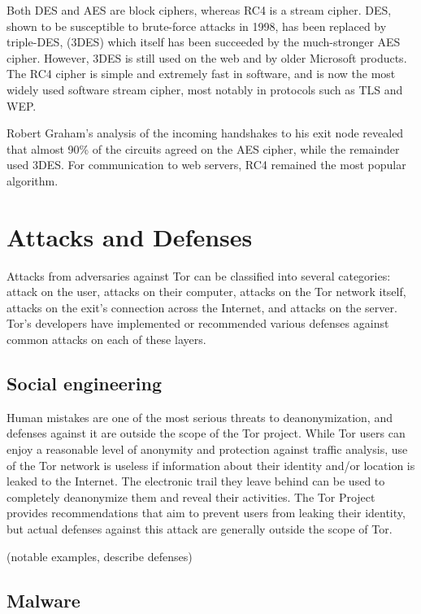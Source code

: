 \documentclass[journal]{IEEEtran}
\begin{document}
Both DES and AES are block ciphers, whereas RC4 is a stream cipher. DES, shown to be susceptible to brute-force attacks in 1998, has been replaced by triple-DES, (3DES) which itself has been succeeded by the much-stronger AES cipher. However, 3DES is still used on the web and by older Microsoft products.\cite{NIST2007}\cite{Bogdanov2011}\cite{Nikolic2009} The RC4 cipher is simple and extremely fast in software, and is now the most widely used software stream cipher, most notably in protocols such as TLS and WEP.

Robert Graham's analysis of the incoming handshakes to his exit node revealed that almost 90\% of the circuits agreed on the AES cipher, while the remainder used 3DES. For communication to web servers, RC4 remained the most popular algorithm.\cite{Graham2013}

\section{Attacks and Defenses}

Attacks from adversaries against Tor can be classified into several categories: attack on the user, attacks on their computer, attacks on the Tor network itself, attacks on the exit's connection across the Internet, and attacks on the server. Tor's developers have implemented or recommended various defenses against common attacks on each of these layers.

\subsection{Social engineering}

Human mistakes are one of the most serious threats to deanonymization, and defenses against it are outside the scope of the Tor project. While Tor users can enjoy a reasonable level of anonymity and protection against traffic analysis, use of the Tor network is useless if information about their identity and/or location is leaked to the Internet. The electronic trail they leave behind can be used to completely deanonymize them and reveal their activities. The Tor Project provides recommendations that aim to prevent users from leaking their identity, but actual defenses against this attack are generally outside the scope of Tor.

(notable examples, describe defenses)

\subsection{Malware}
\end{document}
